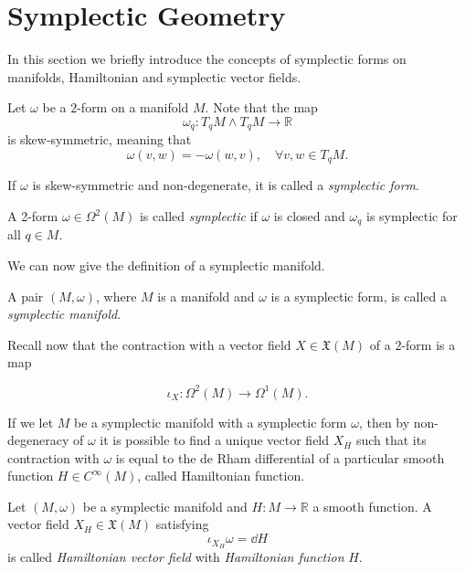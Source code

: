 \section{Symplectic Geometry}
\label{sec:symplectic_geom}

In this section we briefly introduce the concepts of symplectic forms on manifolds, Hamiltonian and symplectic vector fields.

Let $\omega$ be a $2$-form on a manifold $M$. Note that the map
\begin{equation*}
    \omega_q : T_q M \wedge T_q M \rightarrow \mathbb{R}
\end{equation*}
is skew-symmetric, meaning that
\begin{equation*}
    \omega(v, w) = -\omega(w, v), \quad \forall v, w \in T_q M.
\end{equation*}

If $\omega$ is skew-symmetric and non-degenerate, it is called a \emph{symplectic form}.

\begin{definition}
    A 2-form $\omega \in \Omega^2(M)$ is called \emph{symplectic} if $\omega$ is closed and $\omega_q$ is symplectic for all $q \in M$.
\end{definition}

We can now give the definition of a symplectic manifold.
\begin{definition}
\label{def:sympl_mnf}
    A pair $(M, \omega)$, where $M$ is a manifold and $\omega$ is a symplectic form, is called a \emph{symplectic manifold}.
\end{definition}

Recall now that the contraction with a vector field $X \in \mathfrak{X}(M)$ of a $2$-form is a map

\begin{equation*}
    \iota_X : \Omega^2(M) \rightarrow \Omega^1(M).
\end{equation*}

If we let $M$ be a symplectic manifold with a symplectic form $\omega$, then by non-degeneracy of $\omega$ it is possible to find a unique vector field $X_H$ such that its contraction with $\omega$ is equal to the de Rham differential of a particular smooth function $H \in C^\infty(M)$, called Hamiltonian function.

\begin{definition}
    Let $(M, \omega)$ be a symplectic manifold and $H:M\rightarrow \mathbb{R}$ a smooth function.
    A vector field $X_H \in \mathfrak{X}(M)$ satisfying
    \begin{equation*}
        \iota_{X_H}\omega = \dd H
    \end{equation*}
    is called \emph{Hamiltonian vector field} with \emph{Hamiltonian function} $H$.
\end{definition}

